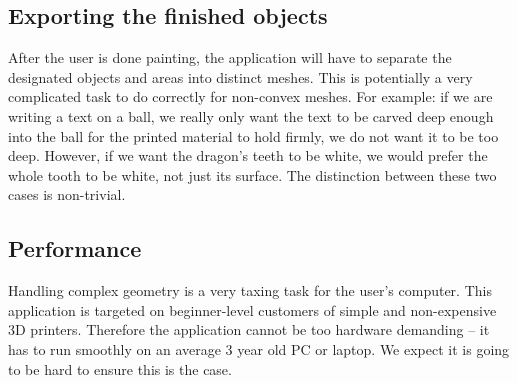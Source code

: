 \subsection{Exporting the finished objects}

After the user is done painting, the application will have to separate the designated objects and areas into distinct meshes. This is potentially a very complicated task to do correctly for non-convex meshes. For example: if we are writing a text on a ball, we really only want the text to be carved deep enough into the ball for the printed material to hold firmly, we do not want it to be too deep. However, if we want the dragon's teeth to be white, we would prefer the whole tooth to be white, not just its surface. The distinction between these two cases is non-trivial.

\subsection{Performance}

Handling complex geometry is a very taxing task for the user's computer. This application is targeted on beginner-level customers of simple and non-expensive 3D printers. Therefore the application cannot be too hardware demanding -- it has to run smoothly on an average 3 year old PC or laptop. We expect it is going to be hard to ensure this is the case.



